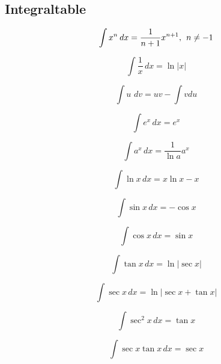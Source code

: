 \documentclass[a4paper]{scrartcl}
\newcommand{\dx}{\hspace{2pt}dx}
\newcommand{\dd}[1]{\hspace{2pt}d#1}
\begin{document}
	\subsection{Integraltable}
\begin{center}	
\begin{multicols}{2}

\begin{equation}
\int x^n \dx = \frac{1}{n+1}x^{n+1}, \hspace{1ex} n\neq-1
\end{equation}

\begin{equation}
\int \frac{1}{x}\dx = \ln |x|
\end{equation}

\begin{equation}
\int u \hspace{2pt} \dd{v} = uv - \int v du
\end{equation}



\begin{equation}
\int e^x \dx = e^x 
\end{equation}

\begin{equation}
\int a^x \dx = \frac{1}{\ln a} a^x
\end{equation}

\begin{equation}
\int \ln x \dx = x \ln x - x
\end{equation}


\begin{equation}
\int \sin x \dx = -\cos x
\end{equation}

\begin{equation}
\int \cos x \dx = \sin x
\end{equation}

\begin{equation}
\int \tan x \dx = \ln |\sec x| 
\end{equation}

\begin{equation}
\int \sec x \dx = \ln |\sec x + \tan x|
\end{equation}

\begin{equation}
\int \sec^2 x \dx = \tan x
\end{equation}

\begin{equation}
\int \sec x \tan x \dx = \sec x
\end{equation}


\end{multicols}
\end{center}
\end{document}

